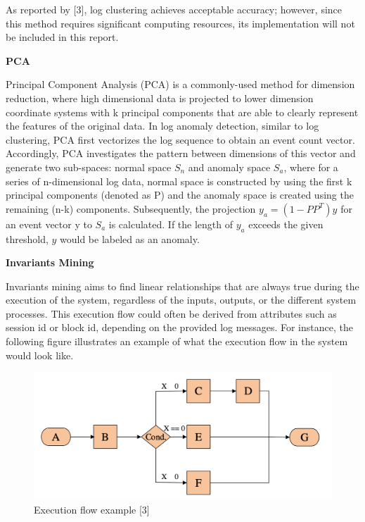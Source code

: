 \documentclass[12pt,a4paper]{article}
\begin{document}
	\vspace{0.15cm}
	
	\noindent As reported by [3], log clustering achieves acceptable accuracy; however, since this method requires significant computing resources, its implementation will not be included in this report.
	
	\vspace{0.3cm}
	\noindent \textbf{PCA}
	\vspace{0.2cm}
	
	\noindent Principal Component Analysis (PCA) is a commonly-used method for dimension reduction, where high dimensional data is projected to lower dimension coordinate systems with k principal components that are able to clearly represent the features of the original data. In log anomaly detection, similar to log clustering, PCA first vectorizes the log sequence to obtain an event count vector. Accordingly, PCA investigates the pattern between dimensions of this vector and generate two sub-spaces: normal space $S_n$ and anomaly space $S_a$, where for a series of n-dimensional log data, normal space is constructed by using the first k principal components (denoted as P) and the anomaly space is created using the remaining (n-k) components. Subsequently, the projection $y_a=(1-PP^T)y$ for an event vector y to $S_a$ is calculated. If the length of $y_a$ exceeds the given threshold, $y$ would be labeled as an anomaly.
	 
	\vspace{0.3cm}
	\noindent \textbf{Invariants Mining}
	\vspace{0.2cm}
	
	\noindent Invariants mining aims to find linear relationships that are always true during the execution of the system, regardless of the inputs, outputs, or the different system processes. This execution flow could often be derived from attributes such as session id or block id, depending on the provided log messages. For instance, the following figure illustrates an example of what the execution flow in the system would look like. 

	
	\vspace{-0.3cm}
	\begin{figure}[H]
		\centering
		\includegraphics[scale=.5]{Figures/im}
		\caption{Execution flow example [3]}
	\end{figure}
\end{document}
